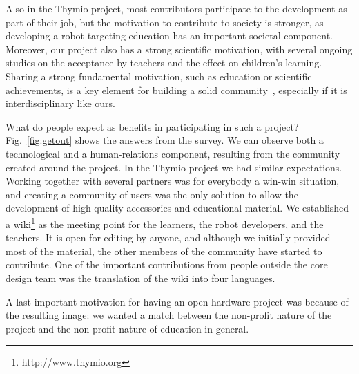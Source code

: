 \documentclass[letterpaper, 10 pt, conference]{ieeeconf}  %
\begin{document}
Also in the Thymio project, most contributors participate to the development as part of their job, but the motivation to contribute to society is stronger, as developing a robot targeting education has an important societal component.
Moreover, our project also has a strong scientific motivation, with several ongoing studies on the acceptance by teachers and the effect on children's learning.
Sharing a strong fundamental motivation, such as education or scientific achievements, is a key element for building a solid community~\cite{Stahlbrost2011}, especially if it is interdisciplinary like ours.

What do people expect as benefits in participating in such a project? Fig.~\ref{fig:getout} shows the answers from the survey.
We can observe both a technological and a human-relations component, resulting from the community created around the project. 
In the Thymio project we had similar expectations. 
Working together with several partners was for everybody a win-win situation, and creating a community of users was the only solution to allow the development of high quality accessories and educational material.
We established a wiki\footnote{http://www.thymio.org} as the meeting point for the learners, the robot developers, and the teachers.
It is open for editing by anyone, and although we initially provided most of the material, the other members of the community have started to contribute.
One of the important contributions from people outside the core design team was the translation of the wiki into four languages.

A last important motivation for having an open hardware project was because of the resulting image: we wanted a match between the non-profit nature of the project and the non-profit nature of education in general. 
\end{document}
